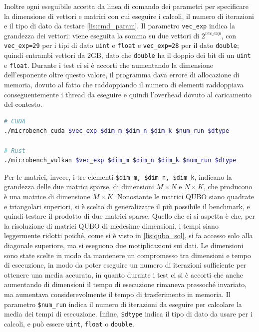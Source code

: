 Inoltre ogni eseguibile accetta da linea di comando dei parametri per specificare la dimensione di vettori e matrici con cui eseguire i calcoli, il numero di iterazioni e il tipo di dato da testare \ref{lis:cmd_param}.
Il parametro \verb|vec_exp| indica la grandezza dei vettori: viene eseguita la somma su due vettori di $2^{vec\_exp}$, con \verb|vec_exp=29| per i tipi di dato \verb|uint| e \verb|float| e \verb|vec_exp=28| per il dato \verb|double|; quindi entrambi vettori da 2GB, dato che \verb|double| ha il doppio dei bit di un \verb|uint| e \verb|float|. Durante i test ci si è accorti che aumentando la dimensione dell'esponente oltre questo valore, il programma dava errore di allocazione di memoria, dovuto al fatto che raddoppiando il numero di elementi raddoppiava conseguentemente i thread da eseguire e quindi l'overhead dovuto al caricamento del contesto.

\vspace{5mm}
\begin{lstlisting}[language=bash, caption=Esecuzione benchmark, label=lis:cmd_param]
# CUDA
./microbench_cuda $vec_exp $dim_m $dim_n $dim_k $num_run $dtype

# Rust
./microbench_vulkan $vec_exp $dim_m $dim_n $dim_k $num_run $dtype
\end{lstlisting}
\vspace{5mm}

Per le matrici, invece, i tre elementi \verb|$dim_m, $dim_n, $dim_k|, indicano la grandezza delle due matrici sparse, di dimensioni $M \times N$ e $N \times K$, che producono è una matrice di dimensione $M \times K$. Nonostante le matrici QUBO siano quadrate e triangolari superiori, si è scelto di generalizzare il più possibile il benchmark, e quindi testare il prodotto di due matrici sparse. Quello che ci si aspetta è che, per la risoluzione di matrici QUBO di medesime dimensioni, i tempi siano leggermente ridotti poiché, come si è visto in \ref{lis:qubo_sol}, si fa accesso solo alla diagonale superiore, ma si eseguono due motiplicazioni sui dati. Le dimensioni sono state scelte in modo da mantenere un compromesso tra dimensioni e tempo di esecuzione, in modo da poter eseguire un numero di iterazioni sufficiente per ottenere una media accurata, in quanto durante i test ci si è accorti che anche aumentando di dimensioni il tempo di esecuzione rimaneva pressoché invariato, ma aumentava considerevolmente il tempo di trasferimento in memoria. Il parametro \verb|$num_run| indica il numero di iterazioni da eseguire per calcolare la media dei tempi di esecuzione. Infine, \verb|$dtype| indica il tipo di dato da usare per i calcoli, e può essere \verb|uint|, \verb|float| o \verb|double|.

